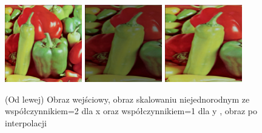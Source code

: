 \documentclass[final,a4paper,openany,12pt]{mwbk}
\begin{document}
\begin{figure}[H]
	\begin{center}
		\includegraphics[width=0.3\textwidth]{1/1Geo_ScaleNJ_Original}
		\includegraphics[width=0.3\textwidth]{1/1Geo_ScaleNJ_Result}
		\includegraphics[width=0.3\textwidth]{1/1Geo_ScaleNJ_Result_Interp}
	\end{center}
	\caption{(Od lewej) Obraz wejściowy, obraz skalowaniu niejednorodnym ze współczynnikiem=2 dla x oraz współczynnikiem=1 dla y , obraz po interpolacji }
\end{figure}
\end{document}
